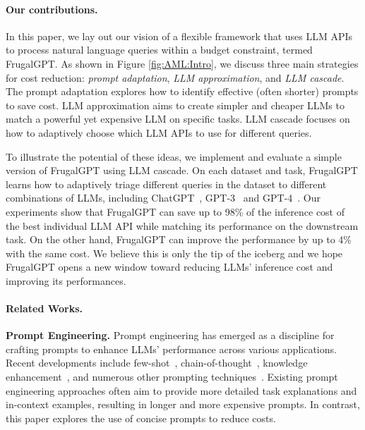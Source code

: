 \documentclass{article}
\numberwithin{equation}{section}
\newcommand{\systemFGPT}{{FrugalGPT}}
\begin{document}
\paragraph{Our contributions.} In this paper, we lay out our vision of a flexible framework that uses LLM APIs to process natural language queries within a  budget constraint, termed \systemFGPT{}. 
As shown in Figure \ref{fig:AML:Intro}, we discuss three main strategies for cost reduction: \textit{prompt adaptation},    \textit{LLM approximation},  
and \textit{LLM cascade}.
The prompt adaptation explores how to identify effective (often shorter)  prompts to save cost. 
LLM approximation aims to create simpler and cheaper LLMs to match a powerful yet expensive LLM on  specific  tasks.  
LLM cascade focuses on how to adaptively choose which LLM APIs to use for different queries. 

To illustrate the potential of these ideas, we  implement and evaluate a simple version of \systemFGPT{} using LLM cascade. On each dataset and task, \systemFGPT{} learns how to adaptively triage different queries in the dataset to different combinations of LLMs, including ChatGPT~\cite{ChatGPTAnn}, GPT-3~\cite{brown2020language} and GPT-4~\cite{GPT4TechReport}. Our experiments show that \systemFGPT{} can save up to 98\% of the inference cost of the best individual LLM API while matching its  performance on the downstream task.
On the other hand, \systemFGPT{} can improve the performance by up to 4\% with the same cost.
We believe this is only the tip of the iceberg and we hope \systemFGPT{} opens a new window toward reducing LLMs' inference cost and improving its performances.

 

\paragraph{Related Works.} \textbf{Prompt Engineering.} Prompt engineering has emerged as a discipline for crafting prompts to enhance LLMs' performance across various applications. Recent developments include few-shot~\cite{brown2020language}, chain-of-thought~\cite{wei2022chain}, knowledge enhancement~\cite{liu2021generated,khattab2022demonstrate}, and numerous other prompting techniques~\cite{mialon2023augmented,khot2022decomposed,zhou2022least,dua2022successive}. Existing prompt engineering approaches often aim to provide more detailed task explanations and in-context examples, resulting in longer and more expensive prompts. In contrast, this paper explores the use of concise prompts to reduce costs.
\end{document}
